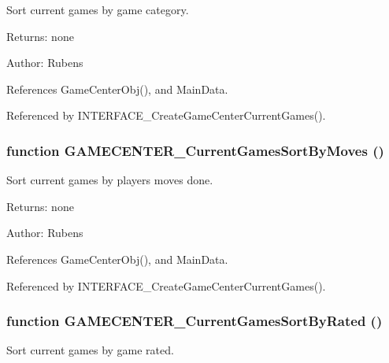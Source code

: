Sort current games by game category. 

\begin{Desc}
\item[Returns:]none \end{Desc}
\begin{Desc}
\item[Author:]Rubens \end{Desc}


References GameCenterObj(), and MainData.

Referenced by INTERFACE\_\-CreateGameCenterCurrentGames().
\subsubsection[GAMECENTER\_\-CurrentGamesSortByMoves]{\setlength{\rightskip}{0pt plus 5cm}function GAMECENTER\_\-CurrentGamesSortByMoves ()}\label{gamecenter_2gamecenter_8js_2b843a56bcfa9ab523598d798c913538}


Sort current games by players moves done. 

\begin{Desc}
\item[Returns:]none \end{Desc}
\begin{Desc}
\item[Author:]Rubens \end{Desc}


References GameCenterObj(), and MainData.

Referenced by INTERFACE\_\-CreateGameCenterCurrentGames().
\subsubsection[GAMECENTER\_\-CurrentGamesSortByRated]{\setlength{\rightskip}{0pt plus 5cm}function GAMECENTER\_\-CurrentGamesSortByRated ()}\label{gamecenter_2gamecenter_8js_ec14b9ce06e23b11455ec09dabd682a2}


Sort current games by game rated. 

